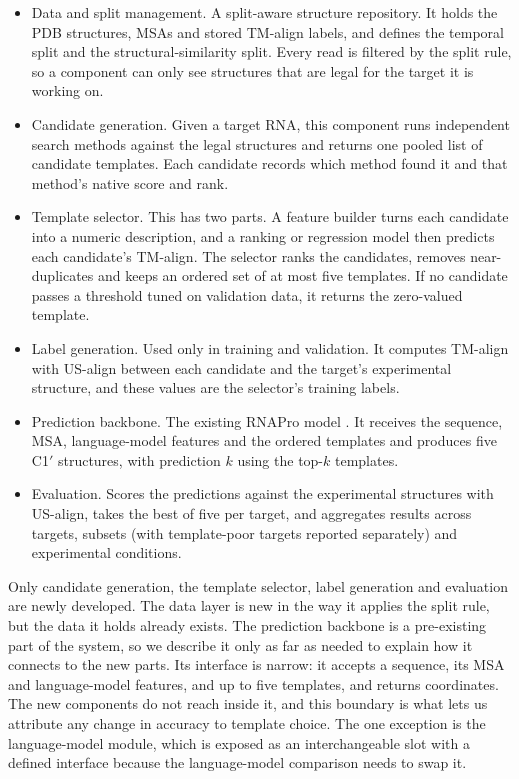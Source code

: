 \documentclass{FastFyp}
\begin{document}
\begin{itemize}
  \item Data and split management. A split-aware structure repository. It holds the PDB structures, MSAs and stored TM-align labels, and defines the temporal split and the structural-similarity split. Every read is filtered by the split rule, so a component can only see structures that are legal for the target it is working on.
  \item Candidate generation. Given a target RNA, this component runs independent search methods against the legal structures and returns one pooled list of candidate templates. Each candidate records which method found it and that method's native score and rank.
  \item Template selector. This has two parts. A feature builder turns each candidate into a numeric description, and a ranking or regression model then predicts each candidate's TM-align. The selector ranks the candidates, removes near-duplicates and keeps an ordered set of at most five templates. If no candidate passes a threshold tuned on validation data, it returns the zero-valued template.
  \item Label generation. Used only in training and validation. It computes TM-align with US-align between each candidate and the target's experimental structure, and these values are the selector's training labels.
  \item Prediction backbone. The existing RNAPro model \cite{leerna}. It receives the sequence, MSA, language-model features and the ordered templates and produces five C1$'$ structures, with prediction $k$ using the top-$k$ templates.
  \item Evaluation. Scores the predictions against the experimental structures with US-align, takes the best of five per target, and aggregates results across targets, subsets (with template-poor targets reported separately) and experimental conditions.
\end{itemize}

Only candidate generation, the template selector, label generation and evaluation are newly developed. The data layer is new in the way it applies the split rule, but the data it holds already exists. The prediction backbone is a pre-existing part of the system, so we describe it only as far as needed to explain how it connects to the new parts. Its interface is narrow: it accepts a sequence, its MSA and language-model features, and up to five templates, and returns coordinates. The new components do not reach inside it, and this boundary is what lets us attribute any change in accuracy to template choice. The one exception is the language-model module, which is exposed as an interchangeable slot with a defined interface because the language-model comparison needs to swap it.
\end{document}
